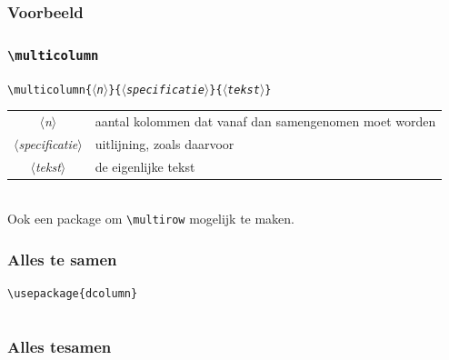 \begin{frame}[fragile]
  \frametitle{Voorbeeld}

  
\end{frame}

\begin{frame}[fragile]
  \frametitle{\texttt{\textbackslash multicolumn}}

  \texttt{\textcolor{uagreen}{\textbackslash multicolumn}\{$\langle$\textsl{n}$\rangle$\}\{$\langle$\textsl{specificatie}$\rangle$\}\{$\langle$\textsl{tekst}$\rangle$\}} \\[1em]

  \begin{tabular}{cl}
    $\langle$\textsl{n}$\rangle$ & aantal kolommen dat vanaf dan samengenomen moet worden \\
    $\langle$\textsl{specificatie}$\rangle$ & uitlijning, zoals daarvoor \\
    $\langle$\textsl{tekst}$\rangle$ & de eigenlijke tekst \\
  \end{tabular} \\[2em]

  Ook een package  om \texttt{\textcolor{uagreen}{\textbackslash multirow}} mogelijk te maken.
\end{frame}

\begin{frame}[fragile]
  \frametitle{Alles te samen}

  \scriptsize
  \begin{verbatim}
\usepackage{dcolumn}
  \end{verbatim}
  \inputminted{tex}{table-example-2.tex}
\end{frame}

\begin{frame}
  \frametitle{Alles tesamen}

  
\end{frame}
